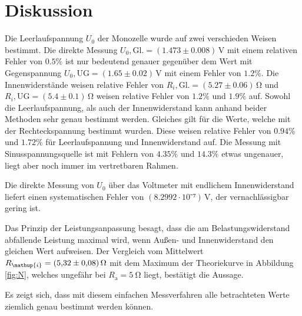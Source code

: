 \section{Diskussion}
\label{sec:Diskussion}
Die Leerlaufspannung $U_0$ der Monozelle wurde auf zwei verschieden Weisen bestimmt. Die direkte Messung $U_0,\mathup{Gl.}=(1.473\pm0.008)\,\si\volt$ mit einem relativen Fehler von $0.5\%$ ist nur bedeutend genauer gegenüber dem Wert mit Gegenspannung $U_0,\mathup{UG}=(1.65\pm0.02)\,\si\volt$ mit einem Fehler von $1.2\%$. 
Die Innenwiderstände weisen relative Fehler von $R_i,\mathup{Gl.}=(5.27\pm0.06)\,\si\ohm$ und $R_i,\mathup{UG}=(5.4\pm0.1)\,\si\ohm$ weisen relative Fehler von $1.2\%$ und $1.9\%$ auf.
Sowohl die Leerlaufspannung, als auch der Innenwiderstand kann anhand beider Methoden sehr genau bestimmt werden.
Gleiches gilt für die Werte, welche mit der Rechteckspannung bestimmt wurden. Diese weisen relative Fehler von $0.94\%$ und $1.72\%$ für Leerlaufspannung und Innenwiderstand auf. Die Messung mit Sinusspannungsquelle ist mit Fehlern von $4.35\%$ und $14.3\%$ etwas ungenauer, liegt aber noch immer im vertretbaren Rahmen.

Die direkte Messung von $U_0$ über das Voltmeter mit endlichem Innenwiderstand liefert einen systematischen Fehler von $(8.2992\cdot10⁻⁷)\,\si{\volt}$, der vernachlässigbar gering ist.

Das Prinzip der Leistungsanpassung besagt, dass die am Belastungswiderstand abfallende Leistung maximal wird, wenn Außen- und Innenwiderstand den gleichen Wert aufweisen.
 Der Vergleich vom Mittelwert $R_\mathup{i}=\SI{5.32\pm0.08}{\ohm}$ mit dem Maximum der Theoriekurve in Abbildung \ref{fig:N}, welches ungefähr bei $R_\mathup{a}=\SI{5}{\ohm}$ liegt, bestätigt die Aussage.

Es zeigt sich, dass mit diesem einfachen Messverfahren alle betrachteten Werte ziemlich genau bestimmt werden können.
